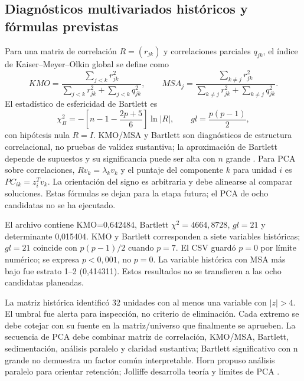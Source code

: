 \documentclass[11pt,a4paper]{article}
\begin{document}
\subsection{Diagnósticos multivariados históricos y fórmulas previstas}

Para una matriz de correlación $R=(r_{jk})$ y correlaciones parciales $q_{jk}$, el índice de Kaiser--Meyer--Olkin global se define como
\begin{equation}
KMO=\frac{\sum_{j<k}r_{jk}^{2}}{\sum_{j<k}r_{jk}^{2}+\sum_{j<k}q_{jk}^{2}},\qquad
MSA_j=\frac{\sum_{k\ne j}r_{jk}^{2}}{\sum_{k\ne j}r_{jk}^{2}+\sum_{k\ne j}q_{jk}^{2}}.
\end{equation}
El estadístico de esfericidad de Bartlett es
\begin{equation}
\chi_B^2=-\left[n-1-\frac{2p+5}{6}\right]\ln|R|,\qquad gl=\frac{p(p-1)}{2},
\end{equation}
con hipótesis nula $R=I$. KMO/MSA y Bartlett son diagnósticos de estructura correlacional, no pruebas de validez sustantiva; la aproximación de Bartlett depende de supuestos y su significancia puede ser alta con $n$ grande \citep{kaiser1974simplicity_corrected,bartlett1950factor}. Para PCA sobre correlaciones, $Rv_k=\lambda_kv_k$ y el puntaje del componente $k$ para unidad $i$ es $PC_{ik}=z_i^Tv_k$. La orientación del signo es arbitraria y debe alinearse al comparar soluciones. Estas fórmulas se dejan para la etapa futura; el PCA de ocho candidatas no se ha ejecutado.

El archivo  contiene KMO=0,642484, Bartlett $\chi^2=4664,8728$, $gl=21$ y determinante 0,015404. KMO y Bartlett corresponden a siete variables históricas; $gl=21$ coincide con $p(p-1)/2$ cuando $p=7$. El CSV guardó $p=0$ por límite numérico; se expresa $p<0,001$, no $p=0$. La variable histórica con MSA más bajo fue estrato 1--2 (0,414311). Estos resultados no se transfieren a las ocho candidatas planeadas.

La matriz histórica identificó 32 unidades con al menos una variable con $|z|>4$. El umbral fue alerta para inspección, no criterio de eliminación. Cada extremo se debe cotejar con su fuente en la matriz/universo que finalmente se aprueben. La secuencia de PCA debe combinar matriz de correlación, KMO/MSA, Bartlett, sedimentación, análisis paralelo y claridad sustantiva; Bartlett significativo con n grande no demuestra un factor común interpretable. Horn propuso análisis paralelo para orientar retención; Jolliffe desarrolla teoría y límites de PCA \citep{horn1965parallel,jolliffe_2002}.
\end{document}
